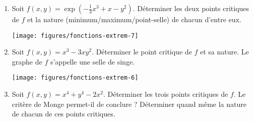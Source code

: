 \documentclass[11pt, class=report,crop=false]{standalone}
\begin{document}
\begin{miniexercices}
    \sauteligne
    \begin{enumerate}
        \item Soit $f(x,y)=\exp(-\frac 13 x^3 + x - y^2)$. Déterminer les deux points critiques de $f$ et la nature (minimum/maximum/point-selle) de chacun d'entre eux.

\begin{center}
\texttt{[image: figures/fonctions-extrem-7]}
\end{center}



        \item Soit $f(x,y)=x^3-3xy^2$. Déterminer le point critique de $f$ et sa nature.
        Le graphe de $f$ s'appelle une \og{}selle de singe\fg{}.

\begin{center}
\texttt{[image: figures/fonctions-extrem-6]}
\end{center}

        
        \item Soit $f(x,y)=x^4+y^4-2x^2$. Déterminer les trois points critiques de $f$.
        Le critère de Monge permet-il de conclure ?
        Déterminer quand même la nature de chacun de ces points critiques.



    \end{enumerate}
\end{miniexercices}
\end{document}
